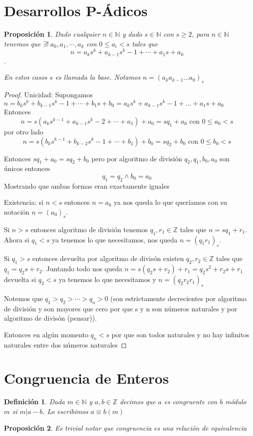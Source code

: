 \documentclass{article}
\theoremstyle{break}
\newtheorem{proposition}{Proposición}
\newtheorem{definition}{Definición}[section]
\def \N{\mathbb{N}}
\def \Z{\mathbb{Z}}
\begin{document}
    \section{Desarrollos P-Ádicos}
    \begin{proposition}
        Dado cualquier $n\in\N $ y dado $s \in \N$ con $s\geq 2$, para $n\in\N$ tenemos que $\exists ! \ a_0,a_1,\cdots,a_k$ con $0\leq a_i < s$ 
        tales que $$n = a_ks^k + a_{k-1}s^k-1+\cdots + a_1s + a_0$$.

        En estos casos $s$ es llamada la base. Notamos $n =(a_ka_{k-1}\ldots a_0)_s $
    \end{proposition}
    \begin{proof}
        Unicidad: Supongamos $n =b_ks^k + b_{k-1}s^k-1+\cdots + b_1s + b_0 = a_ks^k + a_{k-1}s^k-1+\ldots + a_1s + a_0$
        Entonces $$n = s(a_ks^{k-1} + a_{k-1}s^k-2+\cdots + a_1) + a_0  = sq_1 + a_0 \text{ con } 0\leq a_0 < s$$
        por otro lado $$ n = s(b_ks^{k-1} + b_{k-2}s^k-1+\cdots + b_1) + b_0 = sq_2 + b_0 \text{ con } 0\leq b_0 < s $$

        Entonces $sq_1 + a_0 = sq_2 + b_0$ pero por algoritmo de división $q_2,q_1,b_0,a_0$ 
        son únicos entonces $$q_1=q_2 \land b_0 = a_0$$ Mostrando que ambas formas eran exactamente iguales

        Existencia: si $n<s$ entonces $n = a_0$ ya nos queda lo que queríamos con su notación $n = (a_0)_s$.

        Si $n>s$ entonces algoritmo de división tenemos $q_1, r_1\in\Z$ tales que $n = sq_1 +r_1$. Ahora si $q_1 < s$ 
        ya tenemos lo que necesitamos, nos queda $n = (q_1r_1)_s$.

        Si $q_1>s$ entonces devuelta por algoritmo de divisón existen $q_2,r_2\in \Z$ tales que $q_1 = q_2s + r_2$. Juntando todo
        nos queda $n = s(q_2s+r_2) + r_1 = q_2 s^2 + r_2s + r_1$ devuelta si $q_2 < s$ ya tenemos lo que necesitamos y $n = (q_2r_2r_1)_s$

        Notemos que $q_1 > q_2 > \cdots > q_n > 0$ (son estrictamente decrecientes por algoritmo de división y 
        son mayores que cero por que s y n son números naturales y por algoritmo de divisón (pensar)).

        Entonces en algún momento $q_n < s$ por que son todos naturales y no hay infinitos naturales entre dos números naturales
        
    \end{proof}

    \section{Congruencia de Enteros}
        \begin{definition}
            Dada $m\in\N$ y $a,b \in\Z$ decimos que $a$ es congruente con $b$ módulo $m$ si $m|a-b$. Lo escribimos $a\equiv b (m)$
        \end{definition}
        \begin{proposition}
            Es trivial notar que congruencia es una relación de equivalencia
        \end{proposition}
\end{document}
